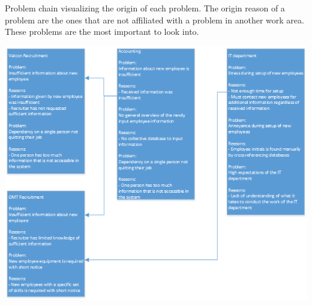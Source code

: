 \label{app:ProblemChain}

Problem chain visualizing the origin of each problem.
The origin reason of a problem are the ones that are not affiliated with a problem in another work area. 
These problems are the most important to look into.

\includegraphics[scale=0.75]{appendix/ProblemChain.png}